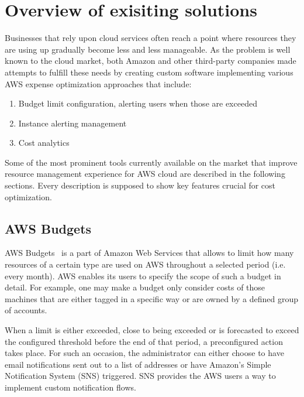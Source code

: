 \documentclass[licencjacka,en]{thesisclass}
\begin{document}
    \section{Overview of exisiting solutions}

    Businesses that rely upon cloud services often reach a point where resources
    they are using up gradually become less and less manageable.
    As the problem is well known to the cloud market, both Amazon
    and other third-party companies made attempts to fulfill these needs
    by creating custom software implementing various AWS expense optimization approaches
    that include:

    \begin{enumerate}
        \item Budget limit configuration, alerting users when those are exceeded
        \item Instance alerting management
        \item Cost analytics
    \end{enumerate}

    Some of the most prominent tools currently available
    on the market that improve resource management experience
    for AWS cloud are described in the following sections.
    Every description is supposed to show key features crucial for cost optimization.

    \subsection{AWS Budgets}

    AWS Budgets~\cite{AWSDocs} is a part of Amazon Web Services that allows
    to limit how many resources of a certain type are used on AWS
    throughout a selected period (i.e. every month).
    AWS enables its users to specify the scope of such a budget in detail.
    For example, one may make a budget only consider costs of those machines
    that are either tagged in a specific way
    or are owned by a defined group of accounts.

    When a limit is either exceeded, close to being exceeded or is forecasted
    to exceed the configured threshold before the end of that period,
    a preconfigured action takes place.
    For such an occasion, the administrator can either choose
    to have email notifications sent out to a list of addresses
    or have Amazon's Simple Notification System (SNS) triggered.
    SNS provides the AWS users a way to implement custom notification flows.
\end{document}
